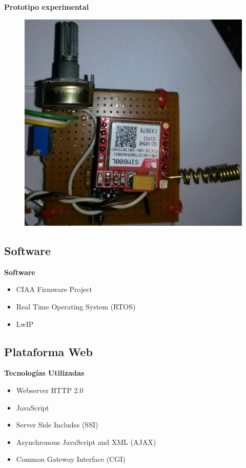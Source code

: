 \documentclass[11pt]{beamer}
\begin{document}
\begin{frame}{\textbf{\LARGE{Prototipo experimental}}}
  \vspace{-.7cm}
  \begin{figure}[H]
    {\includegraphics[width=.5\textwidth]{./imagenes/placa_basica.jpg}}
  \end{figure}	
\end{frame}

\subsection{Software}
\begin{frame}{\textbf{\LARGE{Software}}}
  \fontsize{18pt}{18}\selectfont
    \begin{itemize}
      \item CIAA Firmware Project
      \vspace{15px}
      \item Real Time Operating System (RTOS)
      \vspace{15px}
      \item LwIP
    \end{itemize}

\end{frame}


\subsection{Plataforma Web}

\begin{frame}{\textbf{\LARGE{Tecnologías Utilizadas}}}
  \fontsize{18pt}{18}\selectfont
  \begin{itemize}
    \item Webserver HTTP 2.0
      \vspace{10px}
    \item JavaScript
      \vspace{10px}		
    \item Server Side Includes (SSI)
      \vspace{10px}
    \item Asynchronous JavaScript and XML (AJAX)
      \vspace{10px}
    \item Common Gateway Interface (CGI)
  \end{itemize}
\end{frame}
\end{document}
